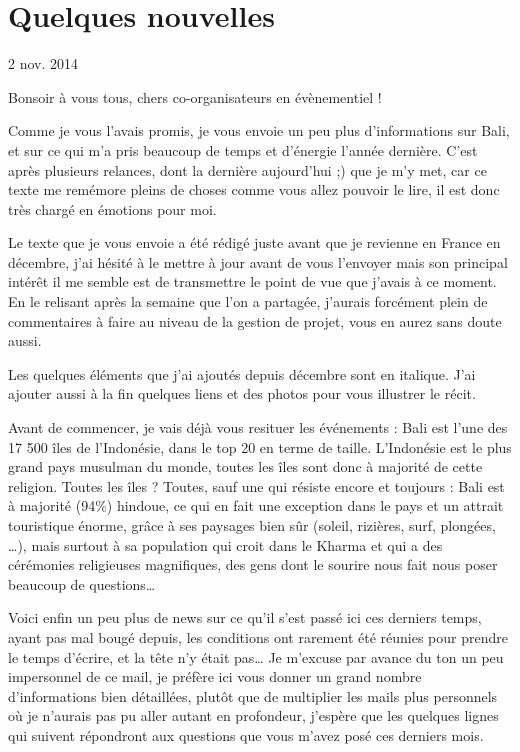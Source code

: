 \section{Quelques nouvelles}

2 nov. 2014


Bonsoir à vous tous, chers co-organisateurs en évènementiel !

Comme je vous l’avais promis, je vous envoie un peu plus d’informations sur Bali, et sur ce qui m’a pris beaucoup de temps et d’énergie l’année dernière. C’est après plusieurs relances, dont la dernière aujourd’hui ;) que je m’y met, car ce texte me remémore pleins de choses comme vous allez pouvoir le lire, il est donc très chargé en émotions pour moi.

Le texte que je vous envoie a été rédigé juste avant que je revienne en France en décembre, j’ai hésité à le mettre à jour avant de vous l'envoyer mais son principal intérêt il me semble est de transmettre le point de vue que j’avais à ce moment. En le relisant après la semaine que l’on a partagée, j’aurais forcément plein de commentaires à faire au niveau de la gestion de projet, vous en aurez sans doute aussi.

Les quelques éléments que j’ai ajoutés depuis décembre sont en italique. J’ai ajouter aussi à la fin quelques liens et des photos pour vous illustrer le récit.

Avant de commencer, je vais déjà vous resituer les événements : Bali est l’une des 17 500 îles de l’Indonésie, dans le top 20 en terme de taille. L’Indonésie est le plus grand pays musulman du monde, toutes les îles sont donc à majorité de cette religion. Toutes les îles ? Toutes, sauf une qui résiste encore et toujours : Bali est à majorité (94\%) hindoue, ce qui en fait une exception dans le pays et un attrait touristique énorme, grâce à ses paysages bien sûr (soleil, rizières, surf, plongées, …), mais surtout à sa population qui croit dans le Kharma et qui a des cérémonies religieuses magnifiques, des gens dont le sourire nous fait nous poser beaucoup de questions…

Voici enfin un peu plus de news sur ce qu’il s’est passé ici ces derniers temps, ayant pas mal bougé depuis, les conditions ont rarement été réunies pour prendre le temps d’écrire, et la tête n’y était pas… Je m’excuse par avance du ton un peu impersonnel de ce mail, je préfère ici vous donner un grand nombre d’informations bien détaillées, plutôt que de multiplier les mails plus personnels où je n’aurais pas pu aller autant en profondeur, j’espère que les quelques lignes qui suivent répondront aux questions que vous m’avez posé ces derniers mois.

